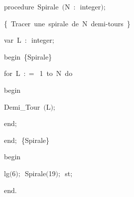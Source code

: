 {\pagebreak[3] 
\vspace{\neglskip}\mbox{\blc  \blk\idt  \mcl procedure\idt \ Spirale\ $($N\ $:$\ integer$)$$;$}\par 
\vspace{\neglskip}\mbox{\blc  \blk\idt  \cmt  \{\ Tracer\ une\ spirale\ de\ N\ demi-tours\ \}\idt }\par 
\pagebreak[3] 
\vspace{\neglskip}\mbox{\blc  \blk\blk\idt  \mcl var\idt \ L\ $:$\ integer$;$}\par 
\vspace{\neglskip}\mbox{\blc  \blk\idt  \mcl begin\idt \ \cmt  \{Spirale\}\idt }\par 
\pagebreak[3] 
\vspace{\neglskip}\mbox{\blc  \blk\blk\idt  \mcl for\idt \ L\ $:$$=$\ 1\ \mcl to\idt \ N\ \mcl do\idt }\par 
\vspace{\neglskip}\mbox{\blc  \blk\blk\blk\idt  \mcl begin\idt }\par 
\vspace{\neglskip}\mbox{\blc  \blk\blk\blk\blk\idt  Demi\_Tour\ $($L$)$$;$}\par 
\vspace{\neglskip}\mbox{\blc  \blk\blk\blk\idt  \mcl end\idt $;$}\par 
\vspace{\neglskip}\mbox{\blc  \blk\idt  \mcl end\idt $;$\ \cmt  \{Spirale\}\idt }\par 
\medskip

\vspace{\neglskip}\mbox{\blc  \idt  \mcl begin\idt }\par 
\vspace{\neglskip}\mbox{\blc  \blk\idt  lg$($6$)$$;$\ Spirale$($19$)$$;$\ st$;$\ }\par 
\vspace{\neglskip}\mbox{\blc  \idt  \mcl end\idt $.$}\par 

\medskip }


